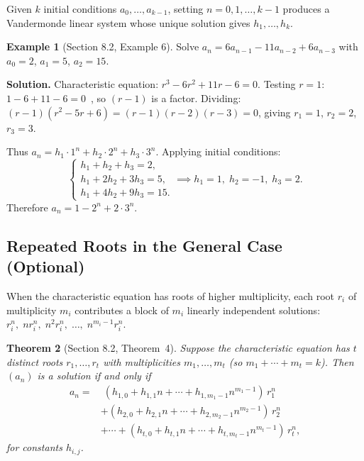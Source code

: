 \documentclass[11pt, a4paper, notitlepage]{report}
\newtheorem{theorem}{Theorem}[section]
\theoremstyle{definition}
\newtheorem{example}[theorem]{Example}
\theoremstyle{remark}
\begin{document}
Given $k$ initial conditions $a_0, \ldots, a_{k-1}$, setting $n = 0, 1, \ldots, k-1$
produces a Vandermonde linear system whose unique solution gives $h_1, \ldots, h_k$.

\begin{example}[Section 8.2, Example 6]
\label{ex:sec82-ex6}
Solve $a_n = 6a_{n-1} - 11a_{n-2} + 6a_{n-3}$ with $a_0 = 2$, $a_1 = 5$, $a_2 = 15$.

\textbf{Solution.}  Characteristic equation: $r^3 - 6r^2 + 11r - 6 = 0$.
Testing $r = 1$: $1 - 6 + 11 - 6 = 0$~\checkmark, so $(r-1)$ is a factor.
Dividing: $(r-1)(r^2 - 5r + 6) = (r-1)(r-2)(r-3) = 0$, giving $r_1 = 1$, $r_2 = 2$,
$r_3 = 3$.

Thus $a_n = h_1 \cdot 1^n + h_2 \cdot 2^n + h_3 \cdot 3^n$.  Applying initial conditions:
\[
  \begin{cases} h_1 + h_2 + h_3 = 2, \\ h_1 + 2h_2 + 3h_3 = 5, \\ h_1 + 4h_2 + 9h_3 = 15. \end{cases}
  \implies h_1 = 1,\; h_2 = -1,\; h_3 = 2.
\]
Therefore $\boxed{a_n = 1 - 2^n + 2 \cdot 3^n}$.
\end{example}

\subsection{Repeated Roots in the General Case (Optional)}
\label{subsec:repeated-optional}

When the characteristic equation has roots of higher multiplicity, each root $r_i$ of
multiplicity $m_i$ contributes a block of $m_i$ linearly independent solutions:
$r_i^n,\; n r_i^n,\; n^2 r_i^n,\; \ldots,\; n^{m_i - 1} r_i^n$.

\begin{theorem}[Section 8.2, Theorem~4]
\label{thm:degk-repeated}
Suppose the characteristic equation has $t$ distinct roots $r_1, \ldots, r_t$ with
multiplicities $m_1, \ldots, m_t$ (so $m_1 + \cdots + m_t = k$).  Then $(a_n)$ is a
solution if and only if
\begin{align*}
  a_n = &\;(h_{1,0} + h_{1,1} n + \cdots + h_{1,m_1-1} n^{m_1-1})\,r_1^n \\
        &+ (h_{2,0} + h_{2,1} n + \cdots + h_{2,m_2-1} n^{m_2-1})\,r_2^n \\
        &+ \cdots + (h_{t,0} + h_{t,1} n + \cdots + h_{t,m_t-1} n^{m_t-1})\,r_t^n,
\end{align*}
for constants $h_{i,j}$.
\end{theorem}
\end{document}
